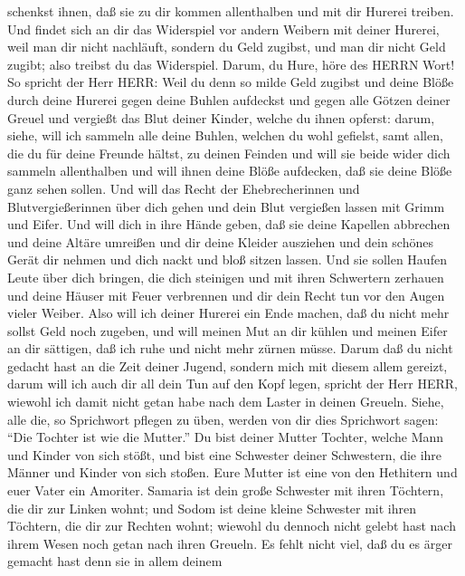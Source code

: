 schenkst ihnen, daß sie zu dir kommen allenthalben und mit dir Hurerei
treiben.  Und findet sich an dir das Widerspiel vor andern
Weibern mit deiner Hurerei, weil man dir nicht nachläuft, sondern du
Geld zugibst, und man dir nicht Geld zugibt; also treibst du das
Widerspiel.  Darum, du Hure, höre des HERRN Wort!
 So spricht der Herr HERR: Weil du denn so milde Geld
zugibst und deine Blöße durch deine Hurerei gegen deine Buhlen aufdeckst
und gegen alle Götzen deiner Greuel und vergießt das Blut deiner Kinder,
welche du ihnen opferst:  darum, siehe, will ich sammeln
alle deine Buhlen, welchen du wohl gefielst, samt allen, die du für
deine Freunde hältst, zu deinen Feinden und will sie beide wider dich
sammeln allenthalben und will ihnen deine Blöße aufdecken, daß sie deine
Blöße ganz sehen sollen.  Und will das Recht der
Ehebrecherinnen und Blutvergießerinnen über dich gehen und dein Blut
vergießen lassen mit Grimm und Eifer.  Und will dich in
ihre Hände geben, daß sie deine Kapellen abbrechen und deine Altäre
umreißen und dir deine Kleider ausziehen und dein schönes Gerät dir
nehmen und dich nackt und bloß sitzen lassen.  Und sie
sollen Haufen Leute über dich bringen, die dich steinigen und mit ihren
Schwertern zerhauen  und deine Häuser mit Feuer verbrennen
und dir dein Recht tun vor den Augen vieler Weiber. Also will ich deiner
Hurerei ein Ende machen, daß du nicht mehr sollst Geld noch zugeben,
 und will meinen Mut an dir kühlen und meinen Eifer an dir
sättigen, daß ich ruhe und nicht mehr zürnen müsse.  Darum
daß du nicht gedacht hast an die Zeit deiner Jugend, sondern mich mit
diesem allem gereizt, darum will ich auch dir all dein Tun auf den Kopf
legen, spricht der Herr HERR, wiewohl ich damit nicht getan habe nach
dem Laster in deinen Greueln.  Siehe, alle die, so
Sprichwort pflegen zu üben, werden von dir dies Sprichwort sagen: ``Die
Tochter ist wie die Mutter.''  Du bist deiner Mutter
Tochter, welche Mann und Kinder von sich stößt, und bist eine Schwester
deiner Schwestern, die ihre Männer und Kinder von sich stoßen. Eure
Mutter ist eine von den Hethitern und euer Vater ein Amoriter.
 Samaria ist dein große Schwester mit ihren Töchtern, die
dir zur Linken wohnt; und Sodom ist deine kleine Schwester mit ihren
Töchtern, die dir zur Rechten wohnt;  wiewohl du dennoch
nicht gelebt hast nach ihrem Wesen noch getan nach ihren Greueln. Es
fehlt nicht viel, daß du es ärger gemacht hast denn sie in allem deinem
